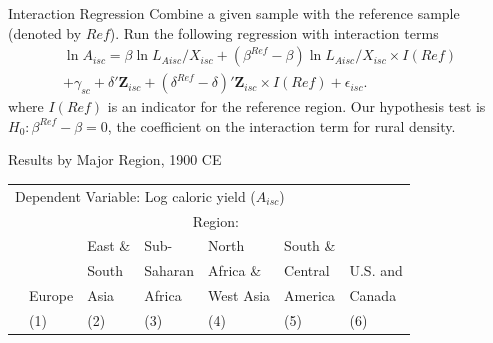 \documentclass[10pt, xcolor=dvipsnames]{beamer}
\begin{document}
\begin{frame}{Interaction Regression}\label{interaction}
Combine a given sample with the reference sample (denoted by $Ref$). Run the following regression with interaction terms
\begin{eqnarray}
    \ln A_{isc} = \beta \ln L_{Aisc}/X_{isc} + (\beta^{Ref} - \beta) \ln L_{Aisc}/X_{isc} \times I(Ref) \\ \nonumber
    + \gamma_{sc} + \delta' \mathbf{Z}_{isc} + (\delta^{Ref} - \delta)'\mathbf{Z}_{isc} \times I(Ref) + \epsilon_{isc}. \label{EQ_interaction}
\end{eqnarray}
where $I(Ref)$ is an indicator for the reference region. Our hypothesis test is $H_0: \beta^{Ref} - \beta = 0$, the coefficient on the interaction term for rural density. 

\hfill \hyperlink{testing}{}
\end{frame}


\begin{frame}{Results by Major Region, 1900 CE}\label{reg1900}

{\scriptsize
\begin{tabularx}{\textwidth}{lXXXXXX}
\midrule
\multicolumn{7}{l}{Dependent Variable: Log caloric yield ($A_{isc}$)} \\
 & \multicolumn{6}{c}{Region:} \\ \cmidrule{2-7}
 &        & East \& & Sub-        & North     & South \&  &  \\
 &        & South   & Saharan     & Africa \& & Central   & U.S. and \\
 & Europe & Asia    & Africa      & West Asia & America   & Canada \\
 & (1) & (2) & (3) & (4) & (5) & (6) \\
\midrule

\midrule
\end{tabularx}
}

\hfill \hyperlink{robustness}{}
\end{frame}
\end{document}
